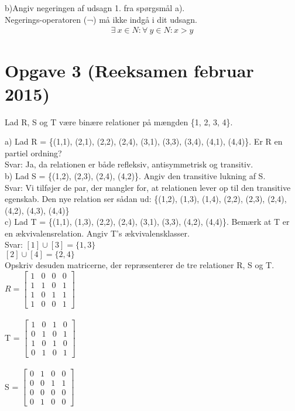 \documentclass{article}
\begin{document}
b)\;Angiv negeringen af udsagn 1. fra spørgsmål a).\\\newline Negerings-operatoren (¬) må ikke indgå i dit udsagn.
 \begin{align*}
\exists\: x \in N:\forall\:y \in N: x > y 
\end{align*} 

\section{Opgave 3 (Reeksamen februar 2015)}
Lad R, S og T være binære relationer på mængden \{1, 2, 3, 4\}.

a) Lad R = \{(1,1), (2,1), (2,2), (2,4), (3,1), (3,3), (3,4), (4,1), (4,4)\}. Er R en partiel ordning?
\\
\newline
Svar: Ja, da relationen er både refleksiv, antisymmetrisk og transitiv.
\\
\newline
b) Lad S = \{(1,2), (2,3), (2,4), (4,2)\}. Angiv den transitive lukning af S.
\\
\newline
Svar: Vi tilføjer de par, der mangler for, at relationen lever op til den transitive egenskab. Den nye relation ser sådan ud: \{(1,2), (1,3), (1,4), (2,2), (2,3), (2,4), (4,2), (4,3), (4,4)\}
\\
\newline
c) Lad T = \{(1,1), (1,3), (2,2), (2,4), (3,1), (3,3), (4,2), (4,4)\}. Bemærk at T er en ækvivalensrelation. Angiv T's ækvivalensklasser.
\\
\newline
Svar: 
\newline
$ [1] \cup [3] = \{ 1,3 \} $
\\
\newline
$ [2]\cup[4] = \{2,4\} $
\\
\newline
Opskriv desuden matricerne, der repræsenterer de tre relationer R, S og T.
\\
\newline
\begin{math}
R =
\begin{bmatrix}
1 & 0 & 0 & 0\\
1 & 1 & 0 & 1\\
1 & 0 & 1 & 1\\
1 & 0 & 0 & 1
\end{bmatrix}
\end{math}
\\
\\
\newline
T =
\begin{math}
\begin{bmatrix}
1 & 0 & 1 & 0\\
0 & 1 & 0 & 1\\
1 & 0 & 1 & 0\\
0 & 1 & 0 & 1
\end{bmatrix}
\end{math}
\\
\\
\newline
S =
\begin{math}
\begin{bmatrix}
0 & 1 & 0 & 0\\
0 & 0 & 1 & 1\\
0 & 0 & 0 & 0\\
0 & 1 & 0 & 0
\end{bmatrix}
\end{math}
\end{document}
